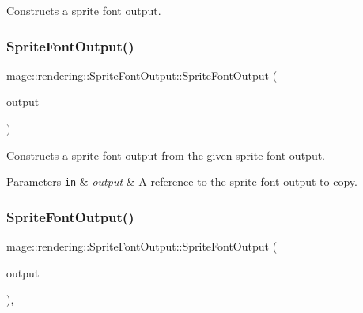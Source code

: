 Constructs a sprite font output. \hypertarget{structmage_1_1rendering_1_1_sprite_font_output_a304a4627f0aaacdb0f9dd0951421c8a2}{}\label{structmage_1_1rendering_1_1_sprite_font_output_a304a4627f0aaacdb0f9dd0951421c8a2} 
\subsubsection{\texorpdfstring{Sprite\+Font\+Output()}{SpriteFontOutput()}\hspace{0.1cm}{\footnotesize\ttfamily [2/3]}}
{\footnotesize\ttfamily mage\+::rendering\+::\+Sprite\+Font\+Output\+::\+Sprite\+Font\+Output (\begin{DoxyParamCaption}\item[{const \hyperlink{structmage_1_1rendering_1_1_sprite_font_output}{Sprite\+Font\+Output} \&}]{output }\end{DoxyParamCaption})\hspace{0.3cm}{\ttfamily [delete]}}

Constructs a sprite font output from the given sprite font output.


\begin{DoxyParams}[1]{Parameters}
\mbox{\tt in}  & {\em output} & A reference to the sprite font output to copy. \\
\hline
\end{DoxyParams}
\hypertarget{structmage_1_1rendering_1_1_sprite_font_output_a19714991b6c2e2aa842022b5c7e281cb}{}\label{structmage_1_1rendering_1_1_sprite_font_output_a19714991b6c2e2aa842022b5c7e281cb} 
\subsubsection{\texorpdfstring{Sprite\+Font\+Output()}{SpriteFontOutput()}\hspace{0.1cm}{\footnotesize\ttfamily [3/3]}}
{\footnotesize\ttfamily mage\+::rendering\+::\+Sprite\+Font\+Output\+::\+Sprite\+Font\+Output (\begin{DoxyParamCaption}\item[{\hyperlink{structmage_1_1rendering_1_1_sprite_font_output}{Sprite\+Font\+Output} \&\&}]{output }\end{DoxyParamCaption})\hspace{0.3cm}{\ttfamily [default]}, {\ttfamily [noexcept]}}


